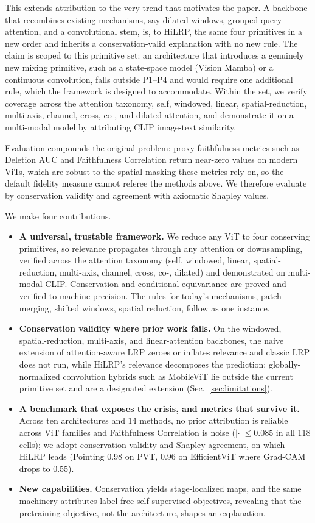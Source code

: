 \documentclass[lettersize,journal]{IEEEtran}
\begin{document}
This extends attribution to the very trend that motivates the paper. A backbone that recombines existing mechanisms, say dilated windows, grouped-query attention, and a convolutional stem, is, to HiLRP, the same four primitives in a new order and inherits a conservation-valid explanation with no new rule. The claim is scoped to this primitive set: an architecture that introduces a genuinely new mixing primitive, such as a state-space model (Vision Mamba) or a continuous convolution, falls outside P1--P4 and would require one additional rule, which the framework is designed to accommodate. Within the set, we verify coverage across the attention taxonomy, self, windowed, linear, spatial-reduction, multi-axis, channel, cross, co-, and dilated attention, and demonstrate it on a multi-modal model by attributing CLIP image-text similarity.

Evaluation compounds the original problem: proxy faithfulness metrics such as Deletion AUC and Faithfulness Correlation return near-zero values on modern ViTs, which are robust to the spatial masking these metrics rely on, so the default fidelity measure cannot referee the methods above. We therefore evaluate by conservation validity and agreement with axiomatic Shapley values.

We make four contributions.
\begin{itemize}[leftmargin=1.2em]
  \item \textbf{A universal, trustable framework.} We reduce any ViT to four conserving primitives, so relevance propagates through any attention or downsampling, verified across the attention taxonomy (self, windowed, linear, spatial-reduction, multi-axis, channel, cross, co-, dilated) and demonstrated on multi-modal CLIP. Conservation and conditional equivariance are proved and verified to machine precision. The rules for today's mechanisms, patch merging, shifted windows, spatial reduction, follow as one instance.
  \item \textbf{Conservation validity where prior work fails.} On the windowed, spatial-reduction, multi-axis, and linear-attention backbones, the naive extension of attention-aware LRP zeroes or inflates relevance and classic LRP does not run, while HiLRP's relevance decomposes the prediction; globally-normalized convolution hybrids such as MobileViT lie outside the current primitive set and are a designated extension (Sec.~\ref{sec:limitations}).
  \item \textbf{A benchmark that exposes the crisis, and metrics that survive it.} Across ten architectures and 14 methods, no prior attribution is reliable across ViT families and Faithfulness Correlation is noise ($|{\cdot}|\le0.085$ in all 118 cells); we adopt conservation validity and Shapley agreement, on which HiLRP leads (Pointing $0.98$ on PVT, $0.96$ on EfficientViT where Grad-CAM drops to $0.55$).
  \item \textbf{New capabilities.} Conservation yields stage-localized maps, and the same machinery attributes label-free self-supervised objectives, revealing that the pretraining objective, not the architecture, shapes an explanation.
\end{itemize}
\end{document}
